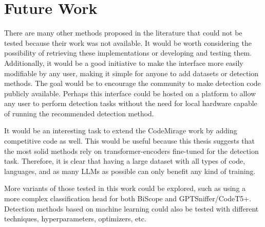 \clearpage
\section{Future Work}
There are many other methods proposed in the literature 
that could not be tested because their work was not available. 
It would be worth considering the possibility of retrieving these 
implementations or developing and testing them. Additionally, it 
would be a good initiative to make the interface more easily 
modifiable by any user, making it simple for anyone to add datasets 
or detection methods. The goal would be to encourage the community 
to make detection code publicly available. Perhaps this interface 
could be hosted on a platform to allow any user to perform detection 
tasks without the need for local hardware capable of running the 
recommended detection method.

It would be an interesting task to extend the CodeMirage work by 
adding competitive code as well. This would be useful because this 
thesis suggests that the most solid methods rely on transformer-encoders 
fine-tuned for the detection task. Therefore, it is clear that having 
a large dataset with all types of code, languages, and as many LLMs as 
possible can only benefit any kind of training.

More variants of those tested in this work could be explored, 
such as using a more complex classification head for both BiScope 
and GPTSniffer/CodeT5+. Detection methods based on machine learning 
could also be tested with different techniques, hyperparameters, optimizers, etc.